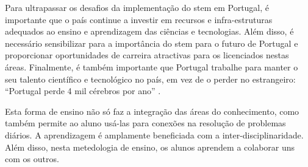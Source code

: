 
Para ultrapassar os desafios da implementação do \acrshort{stem} em Portugal, é importante que o país continue a investir em recursos e infra-estruturas adequados ao ensino e aprendizagem das ciências e tecnologias. Além disso, é necessário sensibilizar para a importância do \acrshort{stem} para o futuro de Portugal e proporcionar oportunidades de carreira atractivas para os licenciados nestas áreas. Finalmente, é também importante que Portugal trabalhe para manter o seu talento científico e tecnológico no país, em vez de o perder no estrangeiro: ``Portugal perde 4 mil cérebros por ano'' \cite{Cerdeira2020}.






Esta forma de ensino não só faz a integração das áreas do conhecimento, como também permite ao aluno usá-las para conexões na resolução de problemas diários. A aprendizagem é amplamente beneficiada com a inter-disciplinaridade. Além disso, nesta metedologia de ensino, os alunos aprendem a colaborar uns com os outros.

